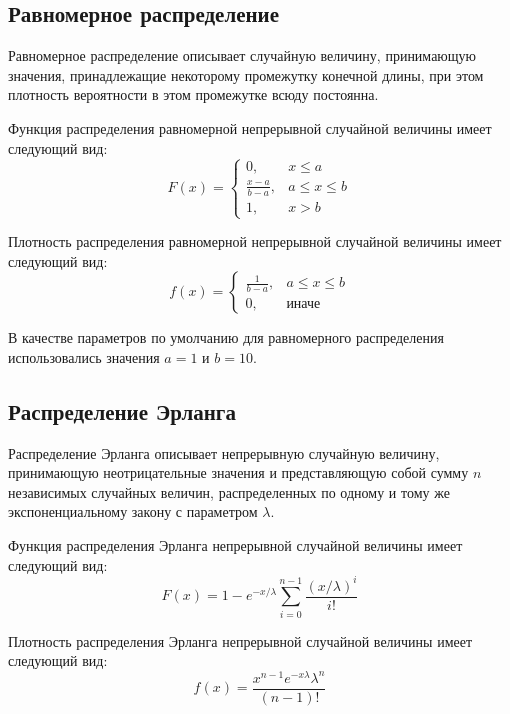 \documentclass[12pt]{report}
\begin{document}
\subsection*{Равномерное распределение}
Равномерное распределение описывает случайную величину, принимающую значения, принадлежащие некоторому промежутку конечной длины, при этом плотность вероятности в этом промежутке всюду постоянна.
\newline

Функция распределения равномерной непрерывной случайной величины имеет следующий вид:
\begin{equation*}
	F(x) = \begin{cases}
		0, & x \leq a \\
		\frac{x-a}{b-a}, & a \leq x \leq b \\
		1, & x > b
	\end{cases}
\end{equation*}

Плотность распределения равномерной непрерывной случайной величины имеет следующий вид:
\begin{equation*}
	f(x) = \begin{cases}
		\frac{1}{b-a}, & a \leq x \leq b \\
		0, & \text{иначе}
	\end{cases}
\end{equation*}

В качестве параметров по умолчанию для равномерного распределения использовались значения $a = 1$ и $b = 10$.

\subsection*{Распределение Эрланга}
Распределение Эрланга описывает непрерывную случайную величину, принимающую неотрицательные значения и представляющую собой сумму $n$ независимых случайных величин, распределенных по одному и тому же экспоненциальному закону с параметром $\lambda$.
\newline

Функция распределения Эрланга непрерывной случайной величины имеет следующий вид:
\begin{equation*}
	F(x) = 1 - e^{-x/\lambda} \sum_{i=0}^{n-1} \frac{(x/\lambda)^i}{i!} 
\end{equation*}

Плотность распределения Эрланга непрерывной случайной величины имеет следующий вид:
\begin{equation*}
	f(x) = \frac{x^{n-1}e^{-x\lambda}\lambda^n}{(n-1)!}
\end{equation*}
\end{document}
